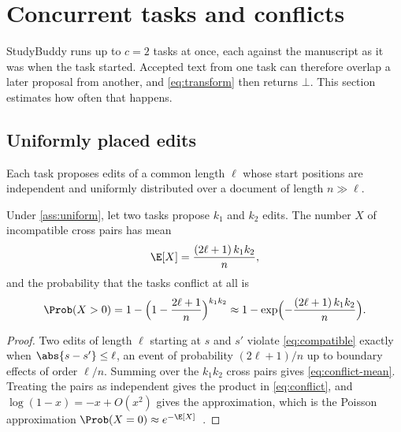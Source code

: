 \section{Concurrent tasks and conflicts}
\label{sec:conflicts}

StudyBuddy runs up to $c = 2$ tasks at once, each against the manuscript as it was
when the task started. Accepted text from one task can therefore overlap a
later proposal from another, and \cref{eq:transform} then returns $\bot$.
This section estimates how often that happens.

\subsection{Uniformly placed edits}

\begin{assumption}
\label{ass:uniform}
Each task proposes edits of a common length $\ell$ whose start positions are
independent and uniformly distributed over a document of length $n \gg \ell$.
\end{assumption}

\begin{proposition}
\label{prop:conflict}
Under \cref{ass:uniform}, let two tasks propose $k_1$ and $k_2$ edits. The
number $X$ of incompatible cross pairs has mean
\begin{equation}
  \E[X] = \frac{(2\ell + 1)\, k_1 k_2}{n},
  \label{eq:conflict-mean}
\end{equation}
and the probability that the tasks conflict at all is
\begin{equation}
  \Prob(X > 0)
  = 1 - \Bigl(1 - \frac{2\ell + 1}{n}\Bigr)^{k_1 k_2}
  \approx 1 - \exp\Bigl(-\frac{(2\ell+1)\, k_1 k_2}{n}\Bigr).
  \label{eq:conflict}
\end{equation}
\end{proposition}

\begin{proof}
Two edits of length $\ell$ starting at $s$ and $s'$ violate
\cref{eq:compatible} exactly when $\abs{s - s'} \le \ell$, an event of
probability $(2\ell+1)/n$ up to boundary effects of order $\ell/n$. Summing over
the $k_1 k_2$ cross pairs gives \cref{eq:conflict-mean}. Treating the pairs as
independent gives the product in \cref{eq:conflict}, and
$\log(1-x) = -x + O(x^2)$ gives the approximation, which is the Poisson
approximation $\Prob(X = 0) \approx e^{-\E[X]}$~\cite{feller1968}.
\end{proof}

